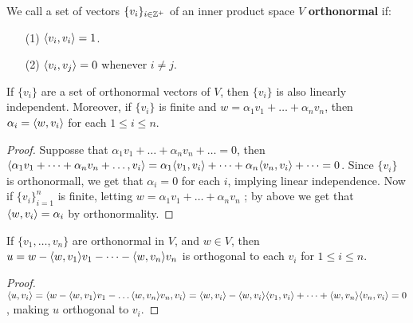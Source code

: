 \begin{definition}
    We call a set of vectors $\{v_i\}_{i \in \mathbb{Z}^+}$ of an inner product space $V$
    \textbf{orthonormal} if:
        \begin{enumerate}
            \item[(1)] $\langle v_i,v_i\rangle=1$.

            \item[(2)] $\langle v_i,v_j\rangle=0$ whenever $i \neq j$.
        \end{enumerate}
\end{definition}

\begin{lemma}
    If $\{v_i\}$ are a set of orthonormal vectors of $V$, then  $\{v_i\}$ is also linearly
    independent. Moreover, if $\{v_i\}$ is finite and $w=\alpha_1v_1+\dots+\alpha_nv_n$, then $\alpha_i=\langle w,v_i\rangle$ for
    each $1 \leq i \leq n.$
\end{lemma}
\begin{proof}
    Supposse that $\alpha_1v_1+\dots+\alpha_nv_n+\dots=0$, then
    $\langle \alpha_1v_1+\dots+\alpha_nv_n+\dots,
    v_i\rangle=\alpha_1\langle v_1,v_i\rangle+\dots+\alpha_n\langle v_n,v_i\rangle+\dots=0$. Since $\{v_i\}$ is
    orthonormall, we get that $\alpha_i=0$ for each  $i$, implying linear independence. Now if
    $\{v_i\}_{i=1}^n$ is finite, letting $w=\alpha_1v_1+\dots+\alpha_nv_n$ ; by above we get that
    $\langle w,v_i\rangle=\alpha_i$ by orthonormality.
\end{proof}

\begin{lemma}
    If $\{v_1, \dots, v_n\}$ are orthonormal in $V$, and  $w \in V$, then
    $u=w-\langle w,v_1\rangle v_1-\dots-\langle w,v_n\rangle v_n$ is orthogonal to each $v_i$ for  $1 \leq i \leq
    n$.
\end{lemma}
\begin{proof}
    $\langle u,v_i\rangle=\langle w-\langle w,v_1\rangle v_1-\dots\langle w,v_n\rangle v_n,
    v_i\rangle=\langle w,v_i\rangle-\langle w,v_i\rangle\langle v_1,v_i\rangle+\dots+\langle w,v_n\rangle\langle v_n,v_i\rangle=0$,
    making $u$ orthogonal to  $v_i$.
\end{proof}

